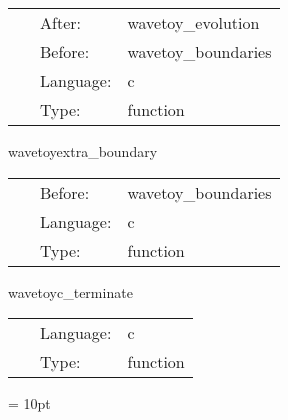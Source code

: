 \documentclass{article}
\begin{document}
\hspace{5mm}

 \begin{tabular*}{160mm}{cll} 
~ & After:  & wavetoy\_evolution \\ 
~ & Before:  & wavetoy\_boundaries \\ 
~ & Language:  & c \\ 
~ & Type:  & function \\ 
\end{tabular*} 


\vspace{5mm}


\hspace{5mm} wavetoyextra\_boundary 

\hspace{5mm}{\it additional boundary conditions for 3d wave equation } 


\hspace{5mm}

 \begin{tabular*}{160mm}{cll} 
~ & Before:  & wavetoy\_boundaries \\ 
~ & Language:  & c \\ 
~ & Type:  & function \\ 
\end{tabular*} 


\vspace{5mm}


\hspace{5mm} wavetoyc\_terminate 

\hspace{5mm}{\it tidy up } 


\hspace{5mm}

 \begin{tabular*}{160mm}{cll} 
~ & Language:  & c \\ 
~ & Type:  & function \\ 
\end{tabular*} 



\vspace{5mm}\parskip = 10pt 
\end{document}
